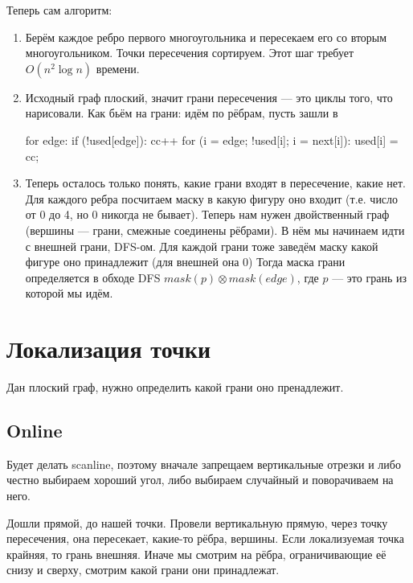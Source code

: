 Теперь сам алгоритм:
\begin{enumerate}
    \item Берём каждое ребро первого многоугольника и пересекаем его
        со вторым многоугольником. Точки пересечения сортируем.
        Этот шаг требует $O(n^2 \log n)$ времени.

    \item Исходный граф плоский, значит грани пересечения --- это циклы 
        того, что нарисовали. Как бьём на грани: идём по рёбрам, пусть зашли в 

\begin{cppcode}
    for edge:
        if (!used[edge]):
            cc++
            for (i = edge; !used[i]; i = next[i]):
                used[i] = cc;
\end{cppcode}

    \item Теперь осталось только понять, какие грани входят в пересечение,
        какие нет. Для каждого ребра посчитаем маску в какую фигуру оно входит
        (т.е. число от 0 до 4, но 0 никогда не бывает). Теперь нам нужен 
        двойственный граф (вершины --- грани, смежные соединены рёбрами).
        В нём мы начинаем идти с внешней грани, DFS-ом.
        Для каждой грани тоже заведём маску какой фигуре оно принадлежит (для внешней она 0)
        Тогда маска грани определяется в обходе DFS $mask(p) \otimes mask(edge)$, 
        где $p$ --- это грань из которой мы идём.
\end{enumerate}

\section{Локализация точки}

Дан плоский граф, нужно определить какой грани оно пренадлежит.

\subsection{Online}

Будет делать scanline, поэтому вначале запрещаем вертикальные отрезки и либо честно выбираем
хороший угол, либо выбираем случайный и поворачиваем на него.

Дошли прямой, до нашей точки. Провели вертикальную прямую, через точку пересечения, 
она пересекает, какие-то рёбра, вершины. Если локализуемая точка крайняя, 
то грань внешняя. Иначе мы смотрим на рёбра, ограничивающие её снизу и сверху, 
смотрим какой грани они принадлежат.

